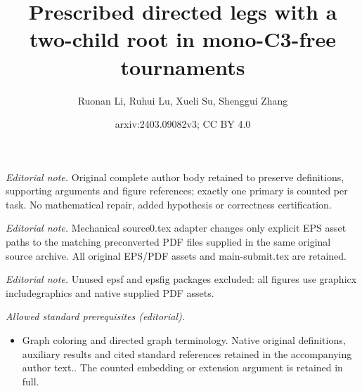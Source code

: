 \documentclass[10pt,a4paper]{article}
\title{Prescribed directed legs with a two-child root in mono-C3-free tournaments}
\author{Ruonan Li, Ruhui Lu, Xueli Su, Shenggui Zhang}
\date{arxiv:2403.09082v3; CC BY 4.0}
\theoremstyle{definition}
\begin{document}
\maketitle
\noindent\textit{Editorial note.} Original complete author body retained to preserve definitions, supporting arguments and figure references; exactly one primary is counted per task. No mathematical repair, added hypothesis or correctness certification.\par\medskip
\noindent\textit{Editorial note.} Mechanical source0.tex adapter changes only explicit EPS asset paths to the matching preconverted PDF files supplied in the same original source archive. All original EPS/PDF assets and main-submit.tex are retained.\par\medskip
\noindent\textit{Editorial note.} Unused epsf and epsfig packages excluded: all figures use graphicx includegraphics and native supplied PDF assets.\par\medskip
\noindent\textit{Allowed standard prerequisites (editorial).}\begin{itemize}
\item Graph coloring and directed graph terminology. Native original definitions, auxiliary results and cited standard references retained in the accompanying author text.. The counted embedding or extension argument is retained in full.
\end{itemize}\medskip
\end{document}
